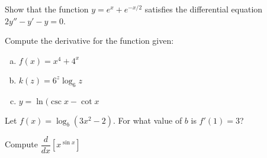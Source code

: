 \documentclass[notes]{subfiles}
\begin{document}
		\begin{ex}
			Show that the function \(y = e^x + e^{-x/2}\) satisfies the differential equation \(2y'' - y' - y = 0\).
		\end{ex}
			
		\begin{ex}
			Compute the derivative for the function given:
			\begin{enumerate}[(a)]
				\item \(f(x) = x^4 + 4^x\)
					
				\item \(k(z) = 6^z\log_6z\)
					
				\item \(y = \ln (\csc x - \cot x\)
			\end{enumerate}
		\end{ex}
			\newpage
			
		\begin{ex}
			Let \(f(x) = \log_b(3x^2-2)\). For what value of \(b\) is \(f'(1) =3\)?
		\end{ex}
			\vs{1}
			
		\begin{ex}
			Compute \(\dfrac{d}{dx}[x^{\sin x}]\)
		\end{ex}
			
		
	\clearpage
\end{document}
